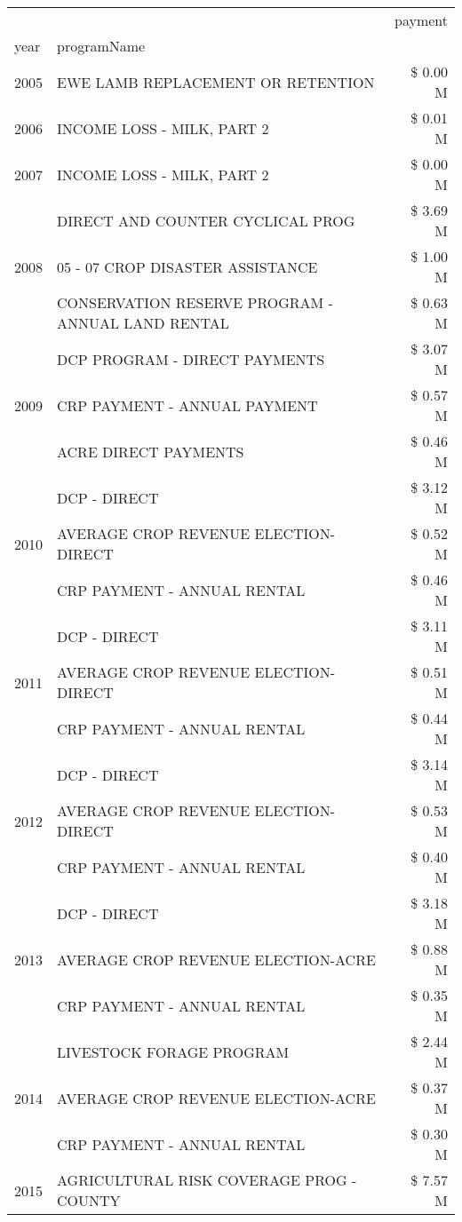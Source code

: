 \begin{tabular}{llr}
\toprule
 &  & payment \\
year & programName &  \\
\midrule
2005 & EWE LAMB REPLACEMENT OR RETENTION & \$ 0.00 M \\
\cline{1-3}
2006 & INCOME LOSS - MILK, PART 2 & \$ 0.01 M \\
\cline{1-3}
2007 & INCOME LOSS - MILK, PART 2 & \$ 0.00 M \\
\cline{1-3}
\multirow[t]{3}{*}{2008} & DIRECT AND COUNTER CYCLICAL PROG & \$ 3.69 M \\
 & 05 - 07 CROP DISASTER ASSISTANCE & \$ 1.00 M \\
 & CONSERVATION RESERVE PROGRAM - ANNUAL LAND RENTAL & \$ 0.63 M \\
\cline{1-3}
\multirow[t]{3}{*}{2009} & DCP PROGRAM - DIRECT PAYMENTS & \$ 3.07 M \\
 & CRP PAYMENT - ANNUAL PAYMENT & \$ 0.57 M \\
 & ACRE DIRECT PAYMENTS & \$ 0.46 M \\
\cline{1-3}
\multirow[t]{3}{*}{2010} & DCP - DIRECT & \$ 3.12 M \\
 & AVERAGE CROP REVENUE ELECTION-DIRECT & \$ 0.52 M \\
 & CRP PAYMENT - ANNUAL RENTAL & \$ 0.46 M \\
\cline{1-3}
\multirow[t]{3}{*}{2011} & DCP - DIRECT & \$ 3.11 M \\
 & AVERAGE CROP REVENUE ELECTION-DIRECT & \$ 0.51 M \\
 & CRP PAYMENT - ANNUAL RENTAL & \$ 0.44 M \\
\cline{1-3}
\multirow[t]{3}{*}{2012} & DCP - DIRECT & \$ 3.14 M \\
 & AVERAGE CROP REVENUE ELECTION-DIRECT & \$ 0.53 M \\
 & CRP PAYMENT - ANNUAL RENTAL & \$ 0.40 M \\
\cline{1-3}
\multirow[t]{3}{*}{2013} & DCP - DIRECT & \$ 3.18 M \\
 & AVERAGE CROP REVENUE ELECTION-ACRE & \$ 0.88 M \\
 & CRP PAYMENT - ANNUAL RENTAL & \$ 0.35 M \\
\cline{1-3}
\multirow[t]{3}{*}{2014} & LIVESTOCK FORAGE PROGRAM & \$ 2.44 M \\
 & AVERAGE CROP REVENUE ELECTION-ACRE & \$ 0.37 M \\
 & CRP PAYMENT - ANNUAL RENTAL & \$ 0.30 M \\
\cline{1-3}
\multirow[t]{3}{*}{2015} & AGRICULTURAL RISK COVERAGE PROG - COUNTY & \$ 7.57 M \\

\end{tabular}
